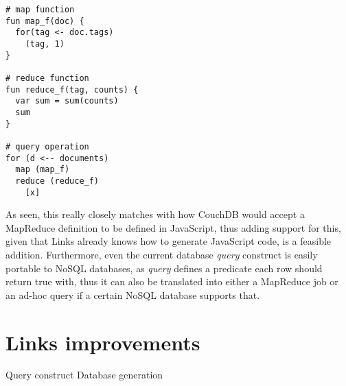\begin{codelisting}
\begin{verbatim}
# map function
fun map_f(doc) {
  for(tag <- doc.tags)
    (tag, 1)
}

# reduce function
fun reduce_f(tag, counts) {
  var sum = sum(counts)
  sum
}

# query operation
for (d <-- documents)
  map (map_f)
  reduce (reduce_f)
    [x]
\end{verbatim}
\end{codelisting}

As seen, this really closely matches with how CouchDB would accept a MapReduce definition to be defined in JavaScript, thus adding support for this, given that Links already knows how to generate JavaScript code, is a feasible addition. Furthermore, even the current database \textit{query} construct is easily portable to NoSQL databases, as \textit{query} defines a predicate each row should return true with, thus it can also be translated into either a MapReduce job or an ad-hoc query if a certain NoSQL database supports that.

\section{Links improvements}

Query construct
Database generation